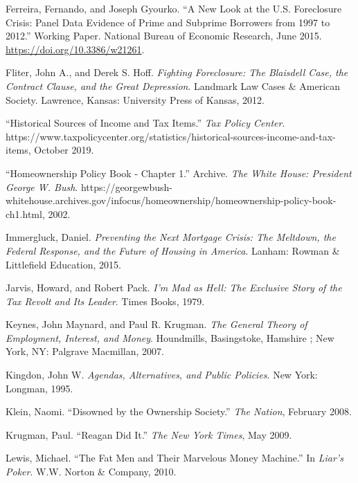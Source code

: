 \documentclass[
]{article}
\begin{document}
\leavevmode\hypertarget{ref-ferreira2015new}{}%
Ferreira, Fernando, and Joseph Gyourko. ``A New Look at the U.S.
Foreclosure Crisis: Panel Data Evidence of Prime and Subprime Borrowers
from 1997 to 2012.'' Working Paper. National Bureau of Economic
Research, June 2015. \url{https://doi.org/10.3386/w21261}.

\leavevmode\hypertarget{ref-fliter2012fighting}{}%
Fliter, John A., and Derek S. Hoff. \emph{Fighting Foreclosure: The
Blaisdell Case, the Contract Clause, and the Great Depression}. Landmark
Law Cases \& American Society. Lawrence, Kansas: University Press of
Kansas, 2012.

\leavevmode\hypertarget{ref-2019historical}{}%
``Historical Sources of Income and Tax Items.'' \emph{Tax Policy
Center}.
https://www.taxpolicycenter.org/statistics/historical-sources-income-and-tax-items,
October 2019.

\leavevmode\hypertarget{ref-2002homeownership}{}%
``Homeownership Policy Book - Chapter 1.'' Archive. \emph{The White
House: President George W. Bush}.
https://georgewbush-whitehouse.archives.gov/infocus/homeownership/homeownership-policy-book-ch1.html,
2002.

\leavevmode\hypertarget{ref-immergluckPreventingNextMortgage2015}{}%
Immergluck, Daniel. \emph{Preventing the Next Mortgage Crisis: The
Meltdown, the Federal Response, and the Future of Housing in America}.
Lanham: Rowman \& Littlefield Education, 2015.

\leavevmode\hypertarget{ref-jarvis1979mad}{}%
Jarvis, Howard, and Robert Pack. \emph{I'm Mad as Hell: The Exclusive
Story of the Tax Revolt and Its Leader}. Times Books, 1979.

\leavevmode\hypertarget{ref-keynes2007general}{}%
Keynes, John Maynard, and Paul R. Krugman. \emph{The General Theory of
Employment, Interest, and Money}. Houndmills, Basingstoke, Hamshire ;
New York, NY: Palgrave Macmillan, 2007.

\leavevmode\hypertarget{ref-kingdon1995agendas}{}%
Kingdon, John W. \emph{Agendas, Alternatives, and Public Policies}. New
York: Longman, 1995.

\leavevmode\hypertarget{ref-klein2008disowned}{}%
Klein, Naomi. ``Disowned by the Ownership Society.'' \emph{The Nation},
February 2008.

\leavevmode\hypertarget{ref-krugman2009reagan}{}%
Krugman, Paul. ``Reagan Did It.'' \emph{The New York Times}, May 2009.

\leavevmode\hypertarget{ref-lewis2010fat}{}%
Lewis, Michael. ``The Fat Men and Their Marvelous Money Machine.'' In
\emph{Liar's Poker}. W.W. Norton \& Company, 2010.
\end{document}

